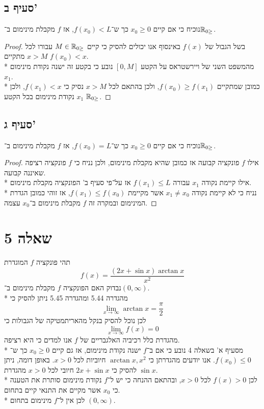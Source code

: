 \subsection{סעיף ב'}
נוכיח כי אם קיים $x_0 \ge 0$ כך ש־$f(x_0) < L$, אז $f$ מקבלת מינימום ב־$\mathbb{R}_{0\ge}$.
\begin{proof}
	בשל הגבול של $f(x)$ באינסוף אנו יכולים להסיק כי קיים $M \in \mathbb{R}_{0\ge}$ עבורו לכל $x > M$ מתקיים $f(x_0) < x$. \\* %
	מהמשפט השני של ויירשטראס על הקטע $[0, M]$ נובע כי בקטע זה ישנה נקודת מינימום $x_1$. \\*
	כמובן שמתקיים $f(x_0) \ge f(x_1)$, ולכן בהתאם לכל $x > M$ נסיק כי $f(x_1) < x$, ולכן $x_1$ נקודת מינימום בכל הקטע $\mathbb{R}_{0\ge}$.
\end{proof}

\subsection{סעיף ג'}
נוכיח כי אם קיים $x_0 \ge 0$ כך ש־$f(x_0) = L$, אז $f$ מקבלת מינימום ב־$\mathbb{R}_{0\ge}$.
\begin{proof}
	אילו $f$ פונקציה קבועה אז כמובן שהיא מקבלת מינימום, ולכן נניח כי $f$ פונקציה רציפה שאיננה קבועה. \\*
	אילו קיימת נקודה $x_1$ עבורה $f(x_1) \le L$ אז על־פי סעיף ב' הפונקציה מקבלת מינימום. \\*
	נניח כי לא קיימת נקודה $x_1 \ne x_0$ אשר מקיימת $f(x_1) \le f(x_0)$, אז זוהי כמובן הגדרת המינימום ובמקרה זה $f$ מקבלת מינימום ב־$x_0$ עצמה.
\end{proof}

\section{שאלה 5}
תהי פונקציה $f$ המוגדרת
\[
	f(x) = \frac{(2x + \sin x) \arctan x}{x^2}
\]
נבדוק האם הפונקציה $f$ מקבלת מינימום ב־$(0, \infty)$. \\*
מהגדרה 5.44 ומהגדרה 5.45 ניתן להסיק כי
\[
	\lim_{x \to \infty} \arctan x = \frac{\pi}{2}
\]
לכן נוכל להסיק בנקל מהאריתמטיקה של הגבולות כי
\[
	\lim_{x \to \infty} f(x) = 0
\]
מהגדרת כלל רכיביה האלגבריים של $f$ אנו למדים כי היא רציפה. \\*
מסעיף א' בשאלה 4 נובע כי אם ב־$f$ ישנה נקודת מינימום, אז גם קיים $x_0 \ge 0$ כך ש־$f(x_0) \le 0$.
אנו יודעים מהגדרתן כי $\arctan x, x^2$ חיוביות לכל $x > 0$. באופן דומה, ניתן להסיק כי $2x + \sin x$ חיובי לכל $x > 0$ מהגדרת $\sin x$. \\*
לכן $f(x) > 0$ לכל $x > 0$, ובהתאם ההנחה כי יש ל־$f$ נקודת מינימום סותרת את הטענה כי $x_0$ אשר מקיים את התנאי קיים בתחום. \\*
לכן אין ל־$f$ מינימום בתחום $(0, \infty)$.

